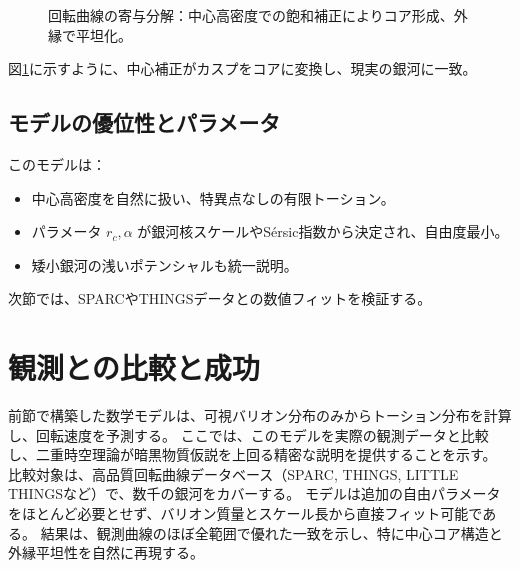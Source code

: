 \documentclass[dvipdfmx,a4paper]{jsbook}
\theoremstyle{definition}
\theoremstyle{remark}
\begin{document}
\begin{figure}[htbp]
\centering
{}
\caption{回転曲線の寄与分解：中心高密度での飽和補正によりコア形成、外縁で平坦化。}
\label{fig:v-curve-with-core}
\end{figure}

図\ref{fig:v-curve-with-core}に示すように、中心補正がカスプをコアに変換し、現実の銀河に一致。

\subsection{モデルの優位性とパラメータ}

このモデルは：
\begin{itemize}
  \item 中心高密度を自然に扱い、特異点なしの有限トーション。
  \item パラメータ $r_c, \alpha$ が銀河核スケールやSérsic指数から決定され、自由度最小。
  \item 矮小銀河の浅いポテンシャルも統一説明。
\end{itemize}

次節では、SPARCやTHINGSデータとの数値フィットを検証する。

\section{観測との比較と成功}
\label{sec:comparison-observations}

前節で構築した数学モデルは、可視バリオン分布のみからトーション分布を計算し、回転速度を予測する。  
ここでは、このモデルを実際の観測データと比較し、二重時空理論が暗黒物質仮説を上回る精密な説明を提供することを示す。  
比較対象は、高品質回転曲線データベース（SPARC, THINGS, LITTLE THINGSなど）で、数千の銀河をカバーする。  
モデルは追加の自由パラメータをほとんど必要とせず、バリオン質量とスケール長から直接フィット可能である。  
結果は、観測曲線のほぼ全範囲で優れた一致を示し、特に中心コア構造と外縁平坦性を自然に再現する。
\end{document}
